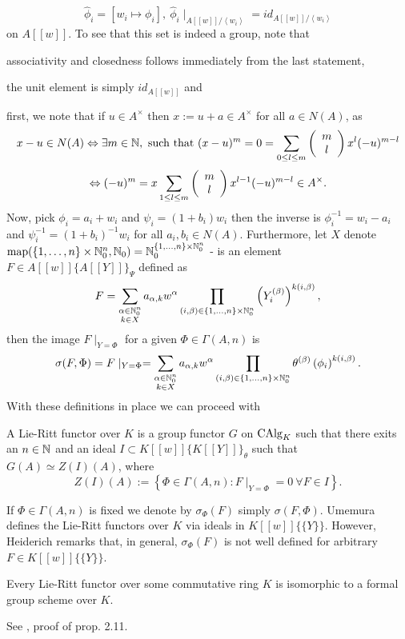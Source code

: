 $$\hat{\phi}_i = \left[w_i \longmapsto
\phi_i\right],\ \hat{\phi}_i\mid_{A[[w]]/\left<w_i\right>} = id_{A[[w]]/\left<w_i\right>}$$
on $A[[w]]$. To see that this set is indeed a group, note that
\bn
\item associativity and closedness follows immediately from the last statement,
\item the unit element is simply $id_{A[[w]]}$ and
\item first, we note that if $u \in A^\times$ then $x := u + a \in A^\times$ for all $a \in N(A)$, as
$$x - u \in N(A) \LRA \exists m \in \nz,\ \trm{such}\ \trm{that}\ (x - u)^m = 0 = \sum_{0\leq l\leq m}\left(\bao{c}m\\l\\
\ea\right) x^l (-u)^{m-l}$$
$$\LRA (-u)^m = x \sum_{1 \leq l\leq m}\left(\bao{c}m\\l\\\ea\right) x^{l-1} (-u)^{m-l} \in A^\times.$$
Now, pick $\phi_i = a_i + w_i$ and $\psi_i = (1 + b_i) w_i$ then the inverse is $\phi_i^{-1} = w_i - a_i$ and $\psi_i^{-1} = (1 + b_i)^{-1} w_i$ for all $a_i, b_i \in N(A)$.
\en
Furthermore, let $X$ denote $\trm{map}(\{1,\ldots,n\} \times \nz_0^n,\nz_0) = \nz_0^{\{1,\ldots,n\} \times \nz_0^n}$ - is an element $F \in A[[w]]\{A[[Y]]\}_\Psi$ defined as
$$F = \sum_{\substack{\alpha \in \nz_0^n\\k \in X}} a_{\alpha,k} w^\alpha \prod_{(i,\beta) \in \{1,\ldots,n\} \times \nz_0^n} \left(Y_i^{(\beta)}\right)^{k(i,\beta)},$$
then the image $F\mid_{Y=\Phi}$ for a given $\Phi \in \Gamma(A,n)$ is
$$\sigma(F,\Phi) = F\mid_{Y=\Phi} = \sum_{\substack{\alpha \in \nz_0^n\\k \in X}} a_{\alpha,k} w^\alpha \prod_{(i,\beta) \in \{1,\ldots,n\} \times \nz_0^n} \theta^{(\beta)}\left(\phi_i\right)^{k(i,\beta)}.$$
With these definitions in place we can proceed with
\begin{defi}
A Lie-Ritt functor over $K$ is a group functor $G$ on $\trm{CAlg}_K$ such that there exits an $n \in \nz$ and an ideal $I \subset K[[w]]\{K[[Y]]\}_\theta$ such that $G(A) \simeq Z(I)(A)$, where
$$Z(I)(A) := \left\{\Phi \in \Gamma(A,n) : F\mid_{Y = \Phi} = 0\ \forall F \in I\right\}.$$
\end{defi}
\bmk If $\Phi \in \Gamma(A,n)$ is fixed we denote by $\sigma_\Phi(F)$ simply $\sigma(F,\Phi)$. Umemura defines the Lie-Ritt functors over $K$ via ideals in $K[[w]]\{\{Y\}\}$. However, Heiderich remarks that, in general, $\sigma_\Phi(F)$ is not well defined for arbitrary $F \in K[[w]]\{\{Y\}\}$.
\begin{prop}\label{LieRittFunctor}
Every Lie-Ritt functor over some commutative ring $K$ is isomorphic to a formal group scheme over $K$.
\end{prop}
\bws See \cite{Heid10}, proof of prop. 2.11.
